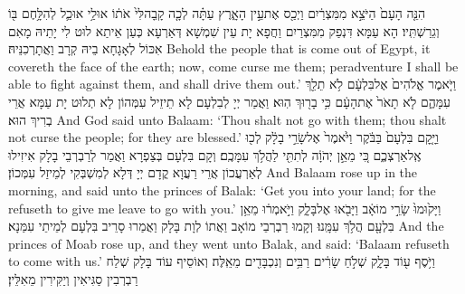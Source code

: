 {הִנֵּ֤ה הָעָם֙ הַיֹּצֵ֣א מִמִּצְרַ֔יִם וַיְכַ֖ס אֶת\maqqaf עֵ֣ין הָאָ֑רֶץ עַתָּ֗ה לְכָ֤ה קָֽבָה\maqqaf לִּי֙ אֹת֔וֹ אוּלַ֥י אוּכַ֛ל לְהִלָּ֥חֶם בּ֖וֹ וְגֵרַשְׁתִּֽיו׃}
{הָא עַמָּא דִּנְפַק מִמִּצְרַיִם וַחֲפָא יָת עֵין שִׁמְשָׁא דְּאַרְעָא כְּעַן אֵיתַא לוּט לִי יָתֵיהּ מָאִם אִכּוֹל לְאָגָחָא בֵיהּ קְרָב וַאֲתָרְכִנֵּיהּ׃}
{Behold the people that is come out of Egypt, it covereth the face of the earth; now, come curse me them; peradventure I shall be able to fight against them, and shall drive them out.’}{}
{וַיֹּ֤אמֶר אֱלֹהִים֙ אֶל\maqqaf בִּלְעָ֔ם לֹ֥א תֵלֵ֖ךְ עִמָּהֶ֑ם לֹ֤א תָאֹר֙ אֶת\maqqaf הָעָ֔ם כִּ֥י בָר֖וּךְ הֽוּא׃}
{וַאֲמַר יְיָ לְבִלְעָם לָא תֵיזֵיל עִמְּהוֹן לָא תְלוּט יָת עַמָּא אֲרֵי בְרִיךְ הוּא׃}
{And God said unto Balaam: ‘Thou shalt not go with them; thou shalt not curse the people; for they are blessed.’}{}
{וַיָּ֤קׇם בִּלְעָם֙ בַּבֹּ֔קֶר וַיֹּ֙אמֶר֙ אֶל\maqqaf שָׂרֵ֣י בָלָ֔ק לְכ֖וּ אֶֽל\maqqaf אַרְצְכֶ֑ם כִּ֚י מֵאֵ֣ן יְהֹוָ֔ה לְתִתִּ֖י לַהֲלֹ֥ךְ עִמָּכֶֽם׃}
{וְקָם בִּלְעָם בְּצַפְרָא וַאֲמַר לְרַבְרְבֵי בָלָק אִיזִילוּ לְאַרְעֲכוֹן אֲרֵי רַעֲוָא קֳדָם יְיָ דְּלָא לְמִשְׁבְּקִי לְמֵיזַל עִמְּכוֹן׃}
{And Balaam rose up in the morning, and said unto the princes of Balak: ‘Get you into your land; for the \lord\space refuseth to give me leave to go with you.’}{}
{וַיָּק֙וּמוּ֙ שָׂרֵ֣י מוֹאָ֔ב וַיָּבֹ֖אוּ אֶל\maqqaf בָּלָ֑ק וַיֹּ֣אמְר֔וּ מֵאֵ֥ן בִּלְעָ֖ם הֲלֹ֥ךְ עִמָּֽנוּ׃}
{וְקָמוּ רַבְרְבֵי מוֹאָב וַאֲתוֹ לְוָת בָּלָק וַאֲמַרוּ סָרֵיב בִּלְעָם לְמֵיתֵי עִמַּנָא׃}
{And the princes of Moab rose up, and they went unto Balak, and said: ‘Balaam refuseth to come with us.’}{}
{וַיֹּ֥סֶף ע֖וֹד בָּלָ֑ק שְׁלֹ֣חַ שָׂרִ֔ים רַבִּ֥ים וְנִכְבָּדִ֖ים מֵאֵֽלֶּה׃}
{וְאוֹסֵיף עוֹד בָּלָק שְׁלַח רַבְרְבִין סַגִּיאִין וְיַקִּירִין מֵאִלֵּין׃}
